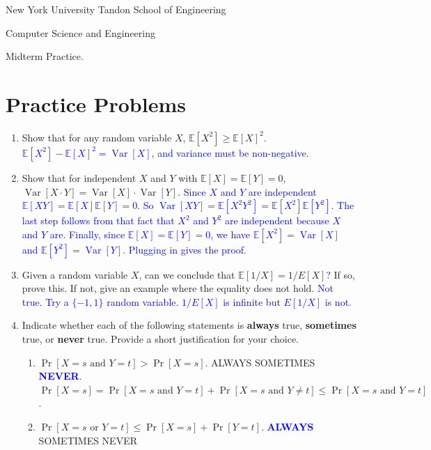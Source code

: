 \documentclass[10pt]{article}
\newcommand{\E}{\mathbb{E}}
\DeclareMathOperator*{\Var}{Var}
\begin{document}
	
\begin{center}
	\normalsize
	New York University Tandon School of Engineering
	
	Computer Science and Engineering
	\medskip
	
	\large
Midterm Practice. 
	\medskip
\end{center} 

\section{Practice Problems}

\begin{enumerate}
	\item Show that for any  random variable ${X}$, $\E[{X}^2] \ge \E[{X}]^2$.
	\textcolor{blue}{$\E[X^2] - \E[{X}]^2 = \Var[X]$, and variance must be non-negative.}
	\item Show that for independent ${X}$ and ${Y}$ with $\E[{X}] = \E[{Y}] = 0$, $\Var[{X} \cdot {Y}] = \Var[X] \cdot \Var[Y]$. 
	\textcolor{blue}{Since $X$ and $Y$ are independent $\E[XY] = \E[X]\E[Y] = 0$. So $\Var[XY] = \E[X^2Y^2] = \E[X^2]\E[Y^2]$. The last step follows from that fact that $X^2$ and $Y^2$ are independent because $X$ and $Y$ are. Finally, since $\E[X] = \E[Y] = 0$, we have $\E[X^2] = \Var[X]$ and $\E[Y^2] = \Var[Y]$. Plugging in gives the proof.}
	\item Given a random variable $X$, can we conclude that $\E[1/X] = 1/E[X]$? If so, prove this. If not, give an example where the equality does not hold.
	\textcolor{blue}{Not true. Try a $\{-1,1\}$ random variable. $1/E[X]$ is infinite but $E[1/X]$ is not.}
	\item Indicate whether each of the following statements is \textbf{always} true, \textbf{sometimes} true, or \textbf{never} true. Provide a short justification for your choice. 
	\begin{enumerate}[label=(\alph*)]
		\item $\Pr[{X} = s \text{ and } {Y} = t] > \Pr[{X} = s]$. \hspace{1em}ALWAYS\hspace{1em} SOMETIMES\hspace{1em} \textcolor{blue}{\textbf{NEVER}}. $\Pr[{X} = s] = \Pr[{X} = s \text{ and } {Y} = t] + \Pr[{X} = s \text{ and } {Y} \neq t] \leq \Pr[{X} = s \text{ and } {Y} = t]$. 
		\item $\Pr[{X} = s \text{ or }  {Y} = t] \le \Pr[{X} = s] + \Pr[{Y} = t]$. \hspace{1em}\textcolor{blue}{\textbf{ALWAYS}}\hspace{1em} SOMETIMES\hspace{1em} NEVER
		

\end{enumerate}
\end{enumerate}
\end{document}
